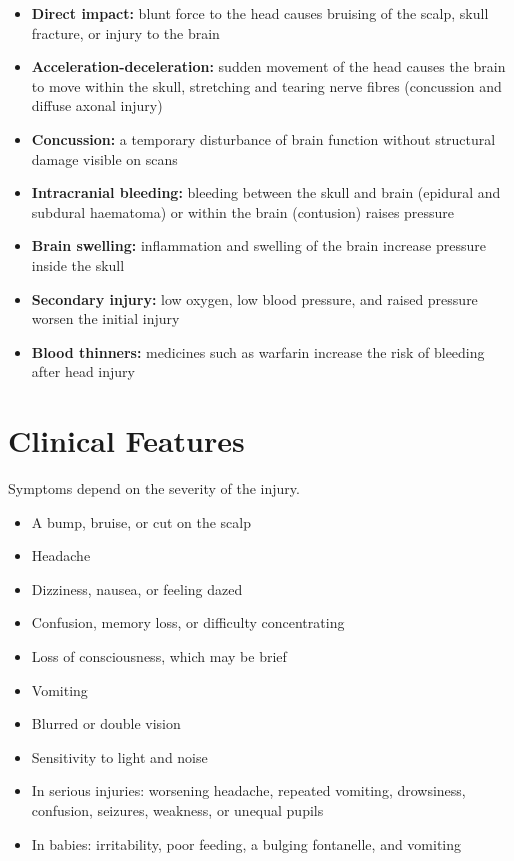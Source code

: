 \begin{itemize}
    \item \textbf{Direct impact:} blunt force to the head causes bruising of the scalp, skull fracture, or injury to the brain
    \item \textbf{Acceleration-deceleration:} sudden movement of the head causes the brain to move within the skull, stretching and tearing nerve fibres (concussion and diffuse axonal injury)
    \item \textbf{Concussion:} a temporary disturbance of brain function without structural damage visible on scans
    \item \textbf{Intracranial bleeding:} bleeding between the skull and brain (epidural and subdural haematoma) or within the brain (contusion) raises pressure
    \item \textbf{Brain swelling:} inflammation and swelling of the brain increase pressure inside the skull
    \item \textbf{Secondary injury:} low oxygen, low blood pressure, and raised pressure worsen the initial injury
    \item \textbf{Blood thinners:} medicines such as warfarin increase the risk of bleeding after head injury
\end{itemize}

\section*{Clinical Features}
Symptoms depend on the severity of the injury.

\begin{itemize}
    \item A bump, bruise, or cut on the scalp
    \item Headache
    \item Dizziness, nausea, or feeling dazed
    \item Confusion, memory loss, or difficulty concentrating
    \item Loss of consciousness, which may be brief
    \item Vomiting
    \item Blurred or double vision
    \item Sensitivity to light and noise
    \item In serious injuries: worsening headache, repeated vomiting, drowsiness, confusion, seizures, weakness, or unequal pupils
    \item In babies: irritability, poor feeding, a bulging fontanelle, and vomiting
\end{itemize}


